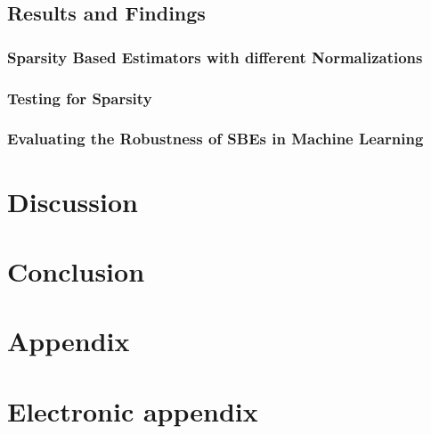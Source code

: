 \subsection{Results and Findings}

\subsubsection{Sparsity Based Estimators with different Normalizations}

\subsubsection{Testing for Sparsity}

\subsubsection{Evaluating the Robustness of SBEs in Machine Learning}


\section{Discussion}



\section{Conclusion}
\label{conclusion}




\newpage

    

\setcounter{page}{5} %

\appendix

\section{Appendix}
\label{app}

\newpage

\section{Electronic appendix}
\label{el_app}

